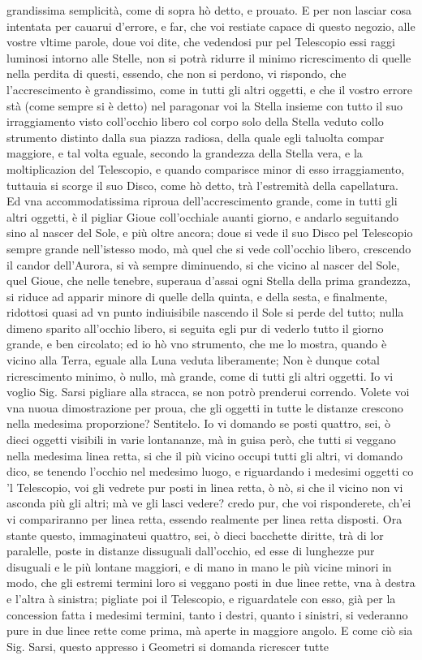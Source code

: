 \documentclass[11pt,twoside,openany]{book}
\begin{document}
grandissima semplicità, come di sopra hò detto, e prouato. E per non lasciar cosa intentata per cauarui d'errore, e far, che voi restiate capace di questo negozio, alle vostre vltime parole, doue voi dite, che vedendosi pur pel Telescopio essi raggi luminosi intorno alle Stelle, non si potrà ridurre il minimo ricrescimento di quelle nella perdita di questi, essendo, che non si perdono, vi rispondo, che l'accrescimento è grandissimo, come in tutti gli altri oggetti, e che il vostro errore stà (come sempre si è detto) nel paragonar voi la Stella insieme con tutto il suo irraggiamento visto coll'occhio libero col corpo solo della Stella veduto collo strumento distinto dalla sua piazza radiosa, della quale egli taluolta compar maggiore, e tal volta eguale, secondo la grandezza della Stella vera, e la moltiplicazion del Telescopio, e quando comparisce minor di esso irraggiamento, tuttauia si scorge il suo Disco, come hò detto, trà l'estremità della capellatura. Ed vna accommodatissima riproua dell'accrescimento grande, come in tutti gli altri oggetti, è il pigliar Gioue coll'occhiale auanti giorno, e andarlo seguitando sino al nascer del Sole, e più oltre ancora; doue si vede il suo Disco pel Telescopio sempre grande nell'istesso modo, mà quel che si vede coll'occhio libero, crescendo il candor dell'Aurora, si và sempre diminuendo, si che vicino al nascer del Sole, quel Gioue, che nelle tenebre, superaua d'assai ogni Stella della prima grandezza, si riduce ad apparir minore di quelle della quinta, e della sesta, e finalmente, ridottosi quasi ad vn punto indiuisibile nascendo il Sole si perde del tutto; nulla dimeno sparito all'occhio libero, si seguita egli pur di vederlo tutto il giorno grande, e ben circolato; ed io hò vno strumento, che me lo mostra, quando è vicino alla Terra, eguale alla Luna veduta liberamente; Non è dunque cotal ricrescimento minimo, ò nullo, mà grande, come di tutti gli altri oggetti. Io vi voglio Sig. Sarsi pigliare alla stracca, se non potrò prenderui correndo. Volete voi vna nuoua dimostrazione per proua, che gli oggetti in tutte le distanze crescono nella medesima proporzione? Sentitelo. Io vi domando se posti quattro, sei, ò dieci oggetti visibili in varie lontananze, mà in guisa però, che tutti si veggano nella medesima linea retta, si che il più vicino occupi tutti gli altri, vi domando dico, se tenendo l'occhio nel medesimo luogo, e riguardando i medesimi oggetti co 'l Telescopio, voi gli vedrete pur posti in linea retta, ò nò, si che il vicino non vi asconda più gli altri; mà ve gli lasci vedere? credo pur, che voi risponderete, ch'ei vi compariranno per linea retta, essendo realmente per linea retta disposti. Ora stante questo, immaginateui quattro, sei, ò dieci bacchette diritte, trà di lor paralelle, poste in distanze dissuguali dall'occhio, ed esse di lunghezze pur disuguali e le più lontane maggiori, e di mano in mano le più vicine minori in modo, che gli estremi termini loro si veggano posti in due linee rette, vna à destra e l'altra à sinistra; pigliate poi il Telescopio, e riguardatele con esso, già per la concession fatta i medesimi termini, tanto i destri, quanto i sinistri, si vederanno pure in due linee rette come prima, mà aperte in maggiore angolo. E come ciò sia Sig. Sarsi, questo appresso i Geometri si domanda ricrescer tutte 
\end{document}
